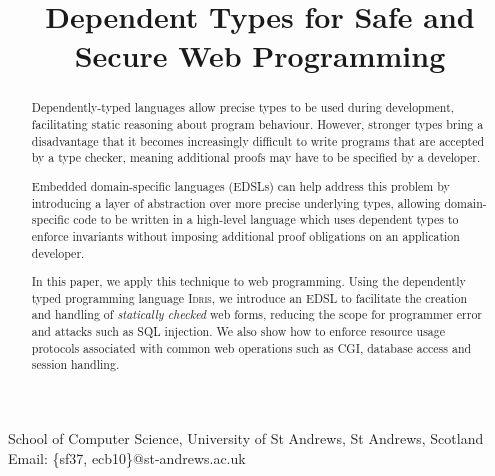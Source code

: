\documentclass[]{sigplanconf}
\begin{document}
\newcommand{\idris}{\textsc{Idris}}
\newcommand{\idata}{\textsf{iData}}
\newcommand{\itasks}{\textsf{iTasks}}
\newcommand{\Idris}{\textsc{Idris}}
\setlength{\pdfpageheight}{\paperheight}
\setlength{\pdfpagewidth}{\paperwidth}






\titlebanner{}        %
\preprintfooter{}   %

\title{Dependent Types for Safe and Secure Web Programming}
           {School of Computer Science, University of St Andrews, St Andrews, Scotland}
           {Email: \{sf37, ecb10\}@st-andrews.ac.uk}

\maketitle

\begin{abstract}
Dependently-typed languages allow precise types to be used during development,
facilitating static reasoning about program behaviour. However,
stronger types bring a disadvantage that it becomes increasingly difficult to
write programs that are accepted by a type checker, meaning additional proofs may
have to be specified by a developer.

Embedded domain-specific languages (EDSLs) can help address this problem by
introducing a layer of abstraction over more precise underlying types,
allowing domain-specific code to be written in a high-level language which uses
dependent types to enforce invariants without imposing additional proof
obligations on an application developer. 

In this paper, we apply this technique to web programming.  Using the
dependently typed programming language \Idris{}, we introduce an EDSL to
facilitate the creation and handling of \emph{statically checked} web forms,
reducing the scope for programmer error and attacks such as SQL injection. We
also show how to enforce resource usage protocols associated with common web
operations such as CGI, database access and session handling.  

\end{abstract}
\end{document}
